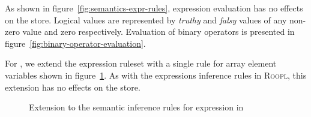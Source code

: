 As shown in figure~\ref{fig:semantics-expr-rules}, expression evaluation has no effects on the store. Logical values are represented by \textit{truthy} and \textit{falsy} values of any non-zero value and zero respectively. Evaluation of binary operators is presented in figure~\ref{fig:binary-operator-evaluation}.

For \rooplpp, we extend the expression ruleset with a single rule for array element variables shown in figure~\ref{sec:semantics-expr-rule-extensions}. As with the expressions inference rules in \textsc{Roopl}, this extension has no effects on the store. 

\begin{figure}[ht]
    \begin{center}
        \DP
    \end{center}
    \caption{Extension to the semantic inference rules for expression in \rooplpp}
    \label{sec:semantics-expr-rule-extensions}
\end{figure}

